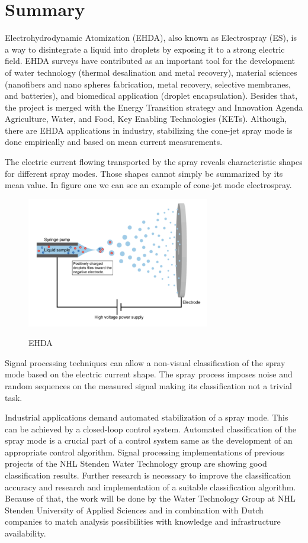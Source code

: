 \section{Summary}

        Electrohydrodynamic Atomization (EHDA), also known as Electrospray (ES), is a way to disintegrate a liquid into droplets by exposing it to a strong electric field.
EHDA surveys have contributed as an important tool for the development of water technology (thermal desalination and metal recovery), material sciences (nanofibers and nano spheres fabrication, metal recovery, selective membranes, and batteries), and biomedical application (droplet encapsulation).
Besides that, the project is merged with the Energy Transition strategy and Innovation Agenda Agriculture, Water, and Food, Key Enabling Technologies (KETs). 
Although, there are EHDA applications in industry, stabilizing the cone-jet spray mode is done empirically and based on mean current measurements. 

The electric current flowing transported by the spray reveals characteristic shapes for different spray modes.
Those shapes cannot simply be summarized by its mean value. In figure one we can see an example of cone-jet mode electrospray.

\begin{figure}[H]
    \center
    \includegraphics[width=8cm]{images/electrospray.png}
    \label{img1}
    \caption{EHDA}
\end{figure}

Signal processing techniques can allow a non-visual classification of the spray mode based on the electric current shape.
The spray process imposes noise and random sequences on the measured signal making its classification not a trivial task. 

Industrial applications demand automated stabilization of a spray mode.
This can be achieved by a closed-loop control system.
Automated classification of the spray mode is a crucial part of a control system same as the development of an appropriate control algorithm. 
Signal processing implementations of previous projects of the NHL Stenden Water Technology group are showing good classification results.
Further research is necessary to improve the classification accuracy and research and implementation of a suitable classification algorithm. 
Because of that, the work will be done by the Water Technology Group at NHL Stenden University of Applied Sciences and in combination with Dutch companies to match analysis possibilities with knowledge and infrastructure availability.

